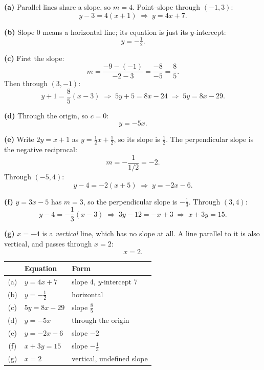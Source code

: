 \begin{solution}
\textbf{(a)} Parallel lines share a slope, so $m=4$. Point--slope through
$(-1,3)$:
\[
y-3=4(x+1) \;\Longrightarrow\; y=4x+7 .
\]

\textbf{(b)} Slope 0 means a horizontal line; its equation is just its
$y$-intercept:
\[
y=-\tfrac12 .
\]

\textbf{(c)} First the slope:
\[
m=\frac{-9-(-1)}{-2-3}=\frac{-8}{-5}=\frac85 .
\]
Then through $(3,-1)$:
\[
y+1=\frac85(x-3) \;\Longrightarrow\; 5y+5=8x-24
\;\Longrightarrow\; 5y=8x-29 .
\]

\textbf{(d)} Through the origin, so $c=0$:
\[
y=-5x .
\]

\textbf{(e)} Write $2y=x+1$ as $y=\tfrac12 x+\tfrac12$, so its slope is
$\tfrac12$. The perpendicular slope is the negative reciprocal:
\[
m=-\frac{1}{1/2}=-2 .
\]
Through $(-5,4)$:
\[
y-4=-2(x+5) \;\Longrightarrow\; y=-2x-6 .
\]

\textbf{(f)} $y=3x-5$ has $m=3$, so the perpendicular slope is $-\tfrac13$.
Through $(3,4)$:
\[
y-4=-\frac13(x-3) \;\Longrightarrow\; 3y-12=-x+3
\;\Longrightarrow\; x+3y=15 .
\]

\textbf{(g)} $x=-4$ is a \emph{vertical} line, which has no slope at all. A
line parallel to it is also vertical, and passes through $x=2$:
\[
x=2 .
\]

\begin{center}
\small\sffamily
\begin{tabular}{@{}c L{4.6cm} L{6.4cm}@{}}
\toprule
 & Equation & Form \\
\midrule
(a) & $y=4x+7$          & slope 4, $y$-intercept 7 \\
(b) & $y=-\tfrac12$     & horizontal \\
(c) & $5y=8x-29$        & slope $\tfrac85$ \\
(d) & $y=-5x$           & through the origin \\
(e) & $y=-2x-6$         & slope $-2$ \\
(f) & $x+3y=15$         & slope $-\tfrac13$ \\
(g) & $x=2$             & vertical, undefined slope \\
\bottomrule
\end{tabular}
\end{center}

\end{solution}

